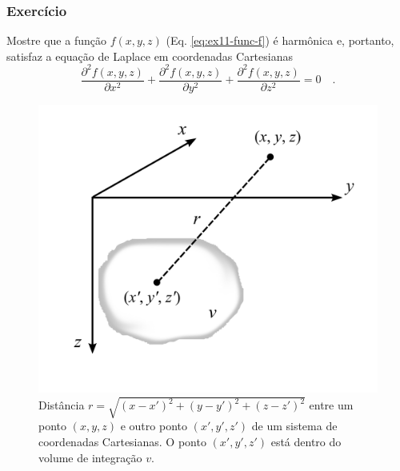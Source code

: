 \documentclass[10pt,a4paper,fleqn]{article}
\begin{document}
\begin{flushleft}
\dotfill
\end{flushleft}

\subsubsection{Exerc\'{i}cio}

Mostre que a funç\~{a}o $f(x,y,z)$ (Eq. \ref{eq:ex11-func-f}) \'{e} harm\^{o}nica e, portanto, satisfaz
a equaç\~{a}o de Laplace em coordenadas Cartesianas
\begin{equation}
\frac{\partial^{2} f(x,y,z)}{\partial x^{2}} +
\frac{\partial^{2} f(x,y,z)}{\partial y^{2}} +
\frac{\partial^{2} f(x,y,z)}{\partial z^{2}} = 0 \quad .
\label{eq:ex11-Laplace}
\end{equation}

\begin{flushleft}
\dotfill
\end{flushleft}

\begin{figure}[h]
    \centering
    \includegraphics[scale=1]{Figs/Fig1.png}
    \caption{Dist\^{a}ncia $r = \sqrt{(x-x')^{2}+(y-y')^{2}+(z-z')^{2}}$ entre
        um ponto $(x,y,z)$ e outro ponto $(x',y',z')$ de um sistema de coordenadas Cartesianas. O ponto
        $(x',y',z')$ est\'{a} dentro do volume de integraç\~{a}o $v$.}   
    \label{fig:fig1}
\end{figure}
\end{document}
